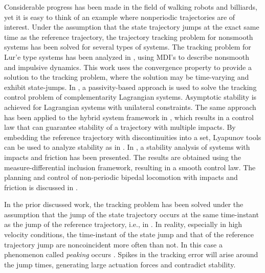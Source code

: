 \documentclass[../DC2019003Bouma.tex]{subfiles}
\begin{document}
Considerable progress has been made in the field of walking robots and billiards, yet it is easy to think of an example where nonperiodic trajectories are of interest. Under the assumption that the state trajectory jumps at the exact same time as the reference trajectory, the trajectory tracking problem for nonsmooth systems has been solved for several types of systems. The tracking problem for Lur'e type systems has been analyzed in \cite{VanDeWouw2008,Wouw2010}, using MDI's to describe nonsmooth and impulsive dynamics. This work uses the convergence property to provide a solution to the tracking problem, where the solution may be time-varying and exhibit state-jumps. In \cite{Bourgeot2005}, a passivity-based approach is used to solve the tracking control problem of complementarity Lagrangian systems. Asymptotic stability is achieved for Lagrangian systems with unilateral constraints. The same approach has been applied to the hybrid system framework in \cite{Naldi2013}, which results in a control law that can guarantee stability of a trajectory with multiple impacts. By embedding the reference trajectory with discontinuities into a set, Lyapunov tools can be used to analyze stability as in \cite{Sanfelice2011,Sanfelice2014}. In \cite{Posa2016}, a stability analysis of systems with impacts and friction has been presented. The results are obtained using the measure-differential inclusion framework, resulting in a smooth control law. The planning and control of non-periodic bipedal locomotion with impacts and friction is discussed in \cite{Zhao2015a}.

In the prior discussed work, the tracking problem has been solved under the assumption that the jump of the state trajectory occurs at the same time-instant as the jump of the reference trajectory, i.e., in \cite{Naldi2013,Sanfelice2014,Posa2016}. In reality, especially in high velocity conditions, the time-instant of the state jump and that of the reference trajectory jump are noncoincident more often than not. In this case a phenomenon called \textit{peaking} occurs \cite{Biemond2013}. Spikes in the tracking error will arise around the jump times, generating large actuation forces and contradict stability.
\end{document}

